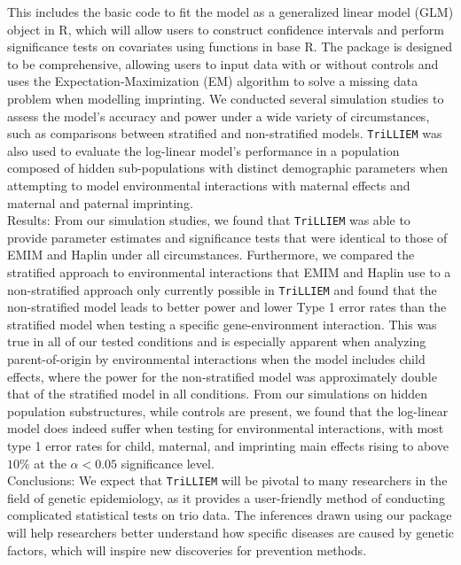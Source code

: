 \documentclass[11pt]{article}
\begin{document}
This includes the basic code to fit the model as a generalized linear model (GLM) object in R, which will allow users to construct confidence intervals and perform significance tests on covariates using functions in base R.
The package is designed to be comprehensive, allowing users to input data with or without controls and uses the Expectation-Maximization (EM) algorithm to solve a missing data problem when modelling imprinting.
We conducted several simulation studies to assess the model's accuracy and power under a wide variety of circumstances, such as comparisons between stratified and non-stratified models.
\texttt{TriLLIEM} was also used to evaluate the log-linear model's performance in a population composed of hidden sub-populations with distinct demographic parameters when attempting to model environmental interactions with maternal effects and maternal and paternal imprinting.\\
Results:
From our simulation studies, we found that \texttt{TriLLIEM} was able to provide parameter estimates and significance tests that were identical to those of EMIM and Haplin under all circumstances.
Furthermore, we compared the stratified approach to environmental interactions that EMIM and Haplin use to a non-stratified approach only currently possible in \texttt{TriLLIEM} and found that the non-stratified model leads to better power and lower Type 1 error rates than the stratified model when testing a specific gene-environment interaction.
This was true in all of our tested conditions and is especially apparent when analyzing parent-of-origin by environmental interactions when the model includes child effects, where the power for the non-stratified model was approximately double that of the stratified model in all conditions.
From our simulations on hidden population substructures, while controls are present, we found that the log-linear model does indeed suffer when testing for environmental interactions, with most type 1 error rates for child, maternal, and imprinting main effects rising to above $10\%$ at the $\alpha < 0.05$ significance level.\\
Conclusions:
We expect that \texttt{TriLLIEM} will be pivotal to many researchers in the field of genetic epidemiology, as it provides a user-friendly method of conducting complicated statistical tests on trio data.
The inferences drawn using our package will help researchers better understand how specific diseases are caused by genetic factors, which will inspire new discoveries for prevention methods.
\end{document}
